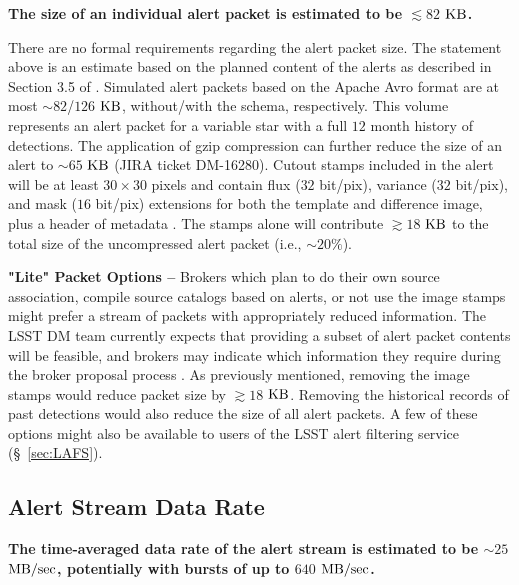 \documentclass[DM,authoryear,toc]{lsstdoc}
\begin{document}
{\bf The size of an individual alert packet is estimated to be $\lesssim82$ $\rm KB$.}

There are no formal requirements regarding the alert packet size. The statement above is an estimate based on the planned content of the alerts as described in Section 3.5 of . Simulated alert packets based on the Apache Avro format are at most $\sim82$/$126$ $\rm KB$, without/with the schema, respectively. This volume represents an alert packet for a variable star with a full $12$ month history of detections. 
The application of gzip compression can further reduce the size of an alert to $\sim65$ $\rm KB$ (JIRA ticket DM-16280). Cutout stamps included in the alert will be at least $30\times30$ pixels and contain flux ($32$ bit/pix), variance ($32$ bit/pix), and mask ($16$ bit/pix) extensions for both the template and difference image, plus a header of metadata . The stamps alone will contribute $\gtrsim18$ $\rm KB$ to the total size of the uncompressed alert packet (i.e., $\sim20\%$).

{\bf "Lite" Packet Options --} Brokers which plan to do their own source association, compile source catalogs based on alerts, or not use the image stamps might prefer a stream of packets with appropriately reduced information. The LSST DM team currently expects that providing a subset of alert packet contents will be feasible, and brokers may indicate which information they require during the broker proposal process  . As previously mentioned, removing the image stamps would reduce packet size by $\gtrsim18$ $\rm KB$. Removing the historical records of past detections would also reduce the size of all alert packets. A few of these options might also be available to users of the LSST alert filtering service (\S~\ref{sec:LAFS}). 


\subsection{Alert Stream Data Rate}\label{ssec:data_rate}

{\bf The time-averaged data rate of the alert stream is estimated to be $\sim25$ $\rm MB/sec$, potentially with bursts of up to $640$ $\rm MB/sec$.}
\end{document}
